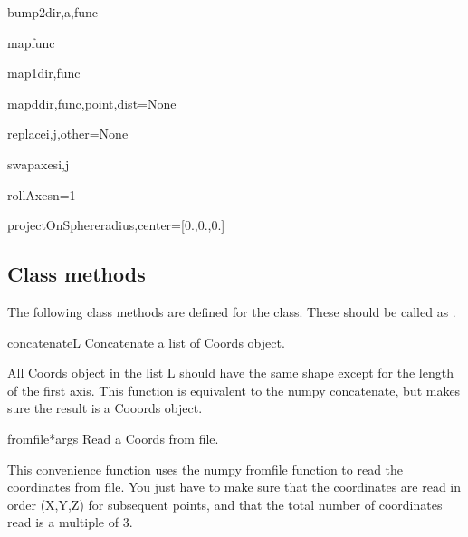 \begin{methoddesc}{bump2}{dir,a,func}
\end{methoddesc}

\begin{methoddesc}{map}{func}
\end{methoddesc}

\begin{methoddesc}{map1}{dir,func}
\end{methoddesc}

\begin{methoddesc}{mapd}{dir,func,point,dist=None}
\end{methoddesc}

\begin{methoddesc}{replace}{i,j,other=None}
\end{methoddesc}

\begin{methoddesc}{swapaxes}{i,j}
\end{methoddesc}

\begin{methoddesc}{rollAxes}{n=1}
\end{methoddesc}

\begin{methoddesc}{projectOnSphere}{radius,center=[0.,0.,0.]}
\end{methoddesc}


\subsection{Class methods}

The following class methods are defined for the  class.
These should be called as .

\begin{methoddesc}{concatenate}{L}
Concatenate a list of Coords object.

 All Coords object in the list L should have the same shape
 except for the length of the first axis.
 This function is equivalent to the numpy concatenate, but makes
 sure the result is a Cooords object.

\classmethod
\end{methoddesc}

\begin{methoddesc}{fromfile}{*args}
Read a Coords from file.

        This convenience function uses the numpy fromfile function to read
        the coordinates from file.
        You just have to make sure that the coordinates are read in order
        (X,Y,Z) for subsequent points, and that the total number of
        coordinates read is a multiple of 3.

\classmethod
\end{methoddesc}


